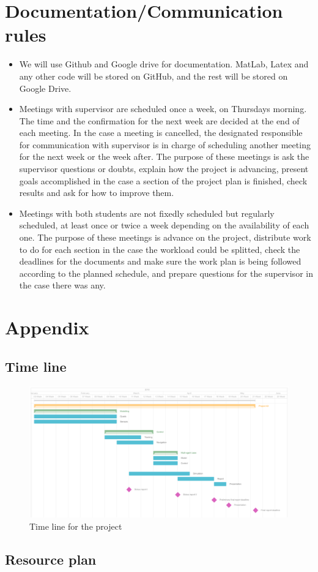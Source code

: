 \documentclass{article}
\begin{document}
	\section{Documentation/Communication rules}
	\begin{itemize}
			\item We will use Github and Google drive for documentation. MatLab, Latex and any other code will be stored on GitHub, and the rest will be stored on Google Drive.
			
			\item Meetings with supervisor are scheduled once a week, on Thursdays morning. The time and the confirmation for the next week are decided at the end of each meeting. In the case a meeting is cancelled, the designated responsible for communication with supervisor is in charge of scheduling another meeting for the next week or the week after. The purpose of these meetings is ask the supervisor questions or doubts, explain how the project is advancing, present goals accomplished in the case a section of the project plan is finished, check results and ask for how to improve them.
			
			\item Meetings with both students are not fixedly scheduled but regularly scheduled, at least once or twice a week depending on the availability of each one. The purpose of these meetings is advance on the project, distribute work to do for each section in the case the workload could be splitted, check the deadlines for the documents and make sure the work plan is being followed according to the planned schedule, and prepare questions for the supervisor in the case there was any.
			
	\end{itemize}

	
	\section{Appendix}
	
	\subsection{Time line}
		\begin{figure}[H]
			\centering
			\includegraphics[width=\linewidth]{img/timeline}
			\caption{Time line for the project}
		\end{figure}
	\subsection{Resource plan}
\end{document}
